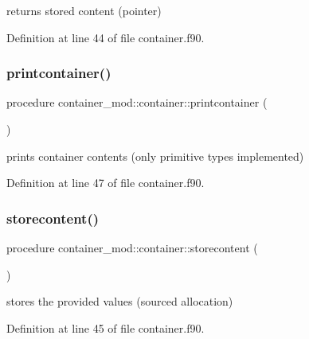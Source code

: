 returns stored content (pointer) 



Definition at line 44 of file container.\+f90.

\mbox{\label{structcontainer__mod_1_1container_ac62ed00e4c79b7c758a5efbc9cc1909a}} 
\subsubsection{\texorpdfstring{printcontainer()}{printcontainer()}}
{\footnotesize\ttfamily procedure container\+\_\+mod\+::container\+::printcontainer (\begin{DoxyParamCaption}{ }\end{DoxyParamCaption})\hspace{0.3cm}{\ttfamily [private]}}



prints container contents (only primitive types implemented) 



Definition at line 47 of file container.\+f90.

\mbox{\label{structcontainer__mod_1_1container_a15e46e6f457bb49604ccf191780f6638}} 
\subsubsection{\texorpdfstring{storecontent()}{storecontent()}}
{\footnotesize\ttfamily procedure container\+\_\+mod\+::container\+::storecontent (\begin{DoxyParamCaption}{ }\end{DoxyParamCaption})\hspace{0.3cm}{\ttfamily [private]}}



stores the provided values (sourced allocation) 



Definition at line 45 of file container.\+f90.



